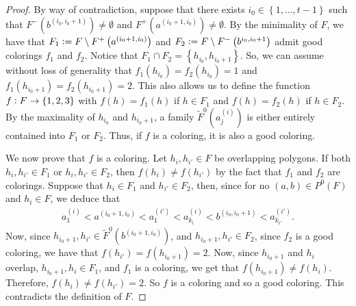 \documentclass[12pt]{article}
\theoremstyle{definition}
\newcommand{\defeq}{\vcentcolon=}
\begin{document}
\begin{proof}
         By way of contradiction,
         suppose that there exists
         $i_0 \in \left\{1, \ldots, t-1\right\}$
         such that $F^{-}\left(b^{\left(i_0, i_0+1\right)}\right)
         \neq \emptyset$ and
         $F^{+}\left(a^{\left(i_0+1, i_0\right)}\right)
         \neq \emptyset$.
         By the minimality of $F$, 
         we have that
         $F_1 \defeq F \setminus F^{+}
         \left(a^{\left(i_0+1, i_0\right)}\right)$
         and
         $F_2 \defeq F \setminus F^{-}
         \left(b^{i_0,i_0+1}\right)$ 
         admit good colorings
         $f_1$ and $f_2$.
         Notice that $F_1 \cap F_2 = 
         \left\{h_{i_0}, h_{i_0+1}\right\}$.
         So, we can assume without loss
         of generality that
         $f_1\left(h_{i_0}\right) = 
         f_2\left(h_{i_0}\right) = 1$ 
         and $f_1\left(h_{i_0+1}\right) =
         f_2\left(h_{i_0+1}\right) =2$.
         This also allows us to define 
         the function $f \vcentcolon 
         F \rightarrow \left\{1, 2, 3\right\}$ 
         with $f\left(h\right) = f_1\left(h\right)$ 
         if $h \in F_1$ and 
         $f\left(h\right) = f_2\left(h\right)$ 
         if $h \in F_2$.
         By the maximality
         of $h_{i_0}$ and $h_{i_0+1}$,
         a family
         $\widetilde{F}^{0}\left(a_{j}^{\left(i\right)}\right)$
         is either entirely contained
         into $F_1$ or $F_2$.
         Thus, if $f$ is a coloring,
         it is also a good coloring.

         We now prove that $f$ is a coloring.
         Let $h_{i}, h_{i'} \in F$ be overlapping
         polygons. If both $h_{i}, h_{i'} \in F_1$ 
         or $h_{i}, h_{i'} \in F_2$, then 
         $f\left(h_{i}\right) \neq f\left(h_{i'}\right)$
         by the fact that $f_1$ and $f_2$ 
         are colorings.
         Suppose that $h_{i} \in F_1$ and
         $h_{i'} \in F_2$, then, since for no
         $\left(a, b\right) \in P^{0}\left(F\right)$ 
         and $h_{i} \in F$, we deduce that
         \begin{gather*}
             a_1^{\left(i\right)} < 
             a^{\left(i_0+1, i_0\right)} <
             a_1^{\left(i'\right)} < 
             a_{k_{i}}^{\left(i\right)} < 
             b^{\left(i_0, i_0+1\right)} < 
             a_{k_{i'}}^{\left(i'\right)}.
         \end{gather*}
         Now, since $h_{i_0+1}, h_{i'} \in 
         \widetilde{F}^{0}\left(b^{\left(i_0+1, i_0\right)}\right)$,
         and $h_{i_0+1}, h_{i'} \in F_2$,
         since $f_2$ is a good
         coloring, we have that $f\left(h_{i'}\right) =
         f\left(h_{i_0+1}\right) = 2$.
         Now, since $h_{i_0+1}$ and $h_{i}$ 
         overlap, 
         $h_{i_0+1}, h_{i} \in F_1$,
         and $f_1$ is a coloring, we get
         that $f\left(h_{i_0+1}\right) \neq
         f\left(h_{i}\right)$.
         Therefore, $f\left(h_{i}\right) \neq 
         f\left(h_{i'}\right) = 2$.
         So $f$ is a coloring and so
         a good coloring.
         This contradicts the definition
         of $F$.


\end{proof}
\end{document}
